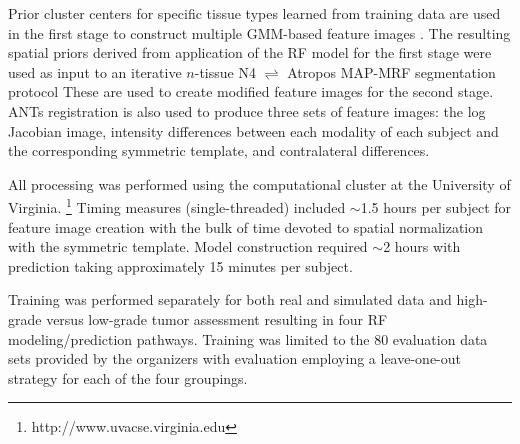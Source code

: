 Prior cluster centers for specific tissue types learned from training data are 
used in the first stage to construct multiple GMM-based feature images \cite{avants2011}.  
The resulting spatial priors derived from application of the RF
 model for the first stage were used as input to an iterative
$n$-tissue N4 $\rightleftharpoons$ Atropos MAP-MRF segmentation protocol 
These are used to create modified feature images for the second stage.
ANTs registration \cite{avants2011a} is also used to produce three sets of 
feature images:  the log Jacobian image, 
intensity differences between each modality of each subject 
and the corresponding symmetric template, and contralateral 
differences.  

All processing was performed
using the computational cluster at the University of Virginia.%
\footnote{
http://www.uvacse.virginia.edu
}
Timing measures (single-threaded) included $\sim$1.5 hours per subject for 
feature image creation with the bulk of time devoted to spatial normalization 
with the symmetric template.  Model
construction required $\sim$2 hours with prediction taking approximately
15 minutes per subject.


Training was performed separately for both real and simulated data and 
high-grade versus low-grade tumor assessment resulting in four RF modeling/prediction
pathways. Training was limited to the 80 evaluation data sets 
provided by the organizers with evaluation employing a leave-one-out
strategy for each of the four groupings.


